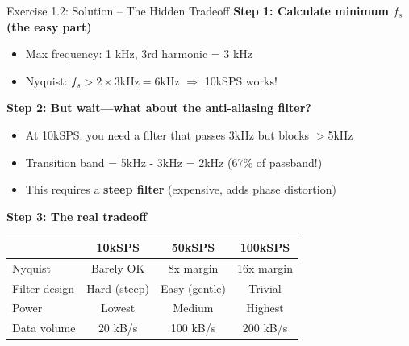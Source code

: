 \documentclass[aspectratio=169,11pt]{beamer}
\begin{document}
\begin{frame}{Exercise 1.2: Solution -- The Hidden Tradeoff}
    \textbf{Step 1: Calculate minimum $f_s$ (the easy part)}
    \begin{itemize}
        \item Max frequency: 1 kHz, 3rd harmonic = 3 kHz
        \item Nyquist: $f_s > 2 \times 3\text{kHz} = 6\text{kHz}$ $\Rightarrow$ 10kSPS works!
    \end{itemize}
    
    \vspace{0.2cm}
    \textbf{Step 2: But wait---what about the anti-aliasing filter?}
    \begin{itemize}
        \item At 10kSPS, you need a filter that passes 3kHz but blocks $>$5kHz
        \item Transition band = 5kHz - 3kHz = 2kHz (67\% of passband!)
        \item This requires a \textbf{steep filter} (expensive, adds phase distortion)
    \end{itemize}
    
    \vspace{0.2cm}
    \textbf{Step 3: The real tradeoff}
    \begin{center}
    \begin{tabular}{lccc}
        \toprule
        & \textbf{10kSPS} & \textbf{50kSPS} & \textbf{100kSPS} \\
        \midrule
        Nyquist & Barely OK & 8x margin & 16x margin \\
        Filter design & Hard (steep) & Easy (gentle) & Trivial \\
        Power & Lowest & Medium & Highest \\
        Data volume & 20 kB/s & 100 kB/s & 200 kB/s \\
        \bottomrule
    \end{tabular}
    \end{center}
\end{frame}
\end{document}
